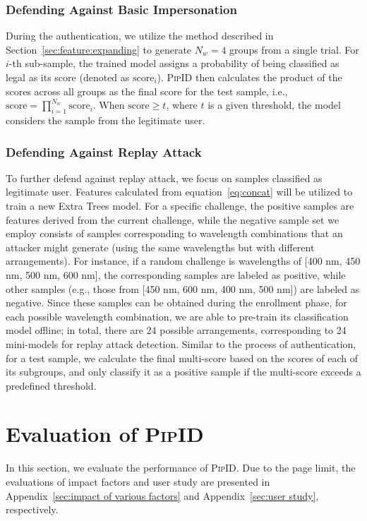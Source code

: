 \documentclass[sigconf]{acmart}
\newcommand{\sysname}{\textsc{PipID}\xspace}
\begin{document}
\subsubsection{Defending Against Basic Impersonation}
During the authentication, we utilize the method described in Section~\ref{sec:feature:expanding} to generate $N_w=4$ groups from a single trial. For $i$-th sub-sample, the trained model assigns a probability of being classified as legal as its score (denoted as $\text{score}_i$). \sysname then calculates the product of the scores across all groups as the final score for the test sample, i.e., $\text{score} = \prod_{i=1}^{N_w} \text{score}_i$. When $\text{score} \geq t$, where $t$ is a given threshold, the model considers the sample from the legitimate user.

\subsubsection{Defending Against Replay Attack}
To further defend against replay attack, we focus on samples classified as legitimate user. Features calculated from equation~\ref{eq:concat} will be utilized to train a new Extra Trees model. For a specific challenge, the positive samples are features derived from the current challenge, while the negative sample set we employ consists of samples corresponding to wavelength combinations that an attacker might generate (using the same wavelengths but with different arrangements). For instance, if a random challenge is wavelengths of [400 nm, 450 nm, 500 nm, 600 nm], the corresponding samples are labeled as positive, while other samples (e.g., those from [450 nm, 600 nm, 400 nm, 500 nm]) are labeled as negative. Since these samples can be obtained during the enrollment phase, for each possible wavelength combination, we are able to pre-train its classification model offline; in total, there are 24 possible arrangements, corresponding to 24 mini-models for replay attack detection. Similar to the process of authentication, for a test sample, we calculate the final multi-score based on the scores of each of its subgroups, and only classify it as a positive sample if the multi-score exceeds a predefined threshold.

\section{Evaluation of \sysname}
In this section, we evaluate the performance of \sysname. Due to the page limit, the evaluations of impact factors and user study are presented in Appendix~\ref{sec:impact of various factors} and Appendix~\ref{sec:user study}, respectively.
\end{document}
